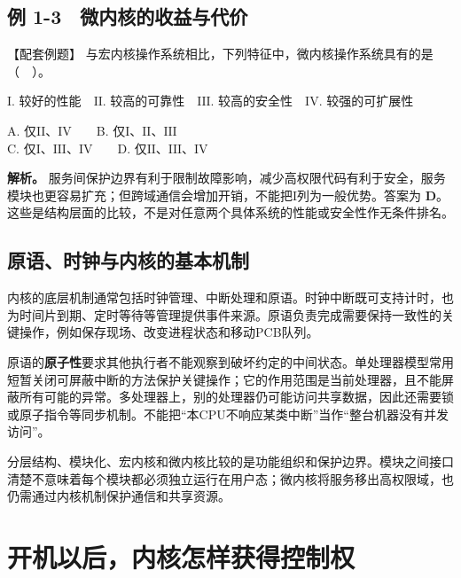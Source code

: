 \subsection{例 1-3　微内核的收益与代价}\label{OS01-ex1-3}

{\begin{example}[配套例题]

【配套例题】 与宏内核操作系统相比，下列特征中，微内核操作系统具有的是（　）。

\ensuremath{\mathrm{I}}. 较好的性能　\ensuremath{\mathrm{II}}. 较高的可靠性　\ensuremath{\mathrm{III}}. 较高的安全性　\ensuremath{\mathrm{IV}}. 较强的可扩展性

A. 仅\ensuremath{\mathrm{II}}、\ensuremath{\mathrm{IV}}　　B. 仅\ensuremath{\mathrm{I}}、\ensuremath{\mathrm{II}}、\ensuremath{\mathrm{III}}\\
C. 仅\ensuremath{\mathrm{I}}、\ensuremath{\mathrm{III}}、\ensuremath{\mathrm{IV}}　　D. 仅\ensuremath{\mathrm{II}}、\ensuremath{\mathrm{III}}、\ensuremath{\mathrm{IV}}

\end{example}}

\textbf{解析。} 服务间保护边界有利于限制故障影响，减少高权限代码有利于安全，服务模块也更容易扩充；但跨域通信会增加开销，不能把\ensuremath{\mathrm{I}}列为一般优势。答案为 \textbf{D}。这些是结构层面的比较，不是对任意两个具体系统的性能或安全性作无条件排名。

\subsection{原语、时钟与内核的基本机制}\label{OS01-kernel-primitives}

内核的底层机制通常包括时钟管理、中断处理和原语。时钟中断既可支持计时，也为时间片到期、定时等待等管理提供事件来源。原语负责完成需要保持一致性的关键操作，例如保存现场、改变进程状态和移动PCB队列。

原语的\textbf{原子性}要求其他执行者不能观察到破坏约定的中间状态。单处理器模型常用短暂关闭可屏蔽中断的方法保护关键操作；它的作用范围是当前处理器，且不能屏蔽所有可能的异常。多处理器上，别的处理器仍可能访问共享数据，因此还需要锁或原子指令等同步机制。不能把``本CPU不响应某类中断''当作``整台机器没有并发访问''。

分层结构、模块化、宏内核和微内核比较的是功能组织和保护边界。模块之间接口清楚不意味着每个模块都必须独立运行在用户态；微内核将服务移出高权限域，也仍需通过内核机制保护通信和共享资源。

\section{开机以后，内核怎样获得控制权}\label{OS01-1-9}

